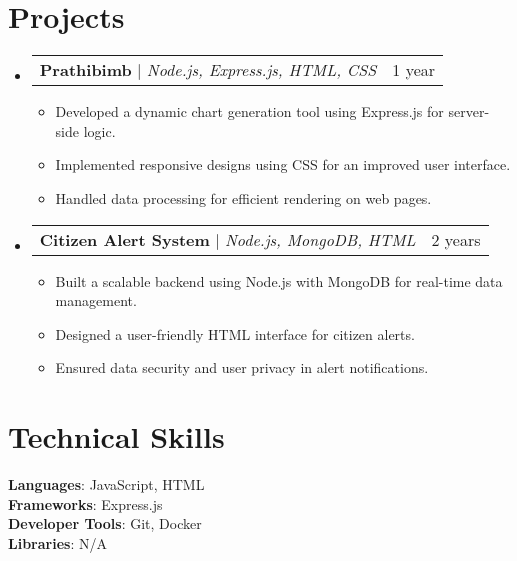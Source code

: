 \documentclass[letterpaper,11pt]{article}
\makeatletter
\newcommand{\resumeItem}[1]{
  \item\small{
    {#1 \vspace{-2pt}}
  }
}
\newcommand{\resumeProjectHeading}[2]{
    \item
    \begin{tabular*}{0.97\textwidth}{l@{\extracolsep{\fill}}r}
      \small#1 & #2 \\
    \end{tabular*}\vspace{-7pt}
}
\newcommand{\resumeSubHeadingListStart}{\begin{itemize}[leftmargin=0.15in, label={}]}
\newcommand{\resumeSubHeadingListEnd}{\end{itemize}}
\newcommand{\resumeItemListStart}{\begin{itemize}}
\newcommand{\resumeItemListEnd}{\end{itemize}\vspace{-5pt}}
\makeatother
\begin{document}
\section{Projects}
    \resumeSubHeadingListStart

      \resumeProjectHeading
          {\textbf{Prathibimb} $|$ \emph{Node.js, Express.js, HTML, CSS}}{1 year}
          \resumeItemListStart

            \resumeItem{Developed a dynamic chart generation tool using Express.js for server-side logic.}

            \resumeItem{Implemented responsive designs using CSS for an improved user interface.}

            \resumeItem{Handled data processing for efficient rendering on web pages.}

          \resumeItemListEnd

      \resumeProjectHeading
          {\textbf{Citizen Alert System} $|$ \emph{Node.js, MongoDB, HTML}}{2 years}
          \resumeItemListStart

            \resumeItem{Built a scalable backend using Node.js with MongoDB for real-time data management.}

            \resumeItem{Designed a user-friendly HTML interface for citizen alerts.}

            \resumeItem{Ensured data security and user privacy in alert notifications.}

          \resumeItemListEnd

    \resumeSubHeadingListEnd

\section{Technical Skills}
 \begin{itemize}[leftmargin=0.15in, label={}]
    \small{\item{
     \textbf{Languages}{: JavaScript, HTML} \\
     \textbf{Frameworks}{: Express.js} \\
     \textbf{Developer Tools}{: Git, Docker} \\
     \textbf{Libraries}{: N/A}
    }}
 \end{itemize}

\end{document}
